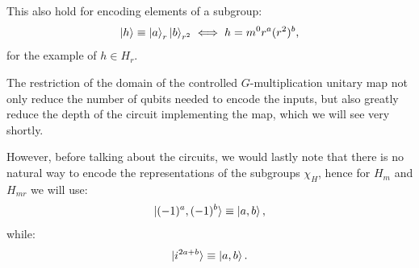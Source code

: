 \documentclass[two column]{article}
\newcommand{\caro}[1]{\textcolor{red}{[#1]}}
\begin{document}
This also hold for encoding elements of a subgroup:
\begin{equation}
    \ket{h} \equiv \ket{a}_r\ket{b}_{r^2} \iff h = m^0r^a(r^2)^b,
\end{equation}
for the example of $h \in H_r$.


The restriction of the domain of the controlled $G$-multiplication unitary map not only reduce the number of qubits needed to encode the inputs, but also greatly reduce the depth of the circuit implementing the map, which we will see very shortly.

However, before talking about the circuits, we would lastly note that there is no natural way to encode the representations of the subgroups $\chi_H$, hence for $H_m$ and $H_{mr}$ we will use:
\begin{equation}
    \ket{(-1)^a,(-1)^b} \equiv \ket{a,b},
\end{equation}
while:
\begin{equation}
    \ket{i^{2a+b}} \equiv \ket{a, b}.
\end{equation}

\end{document}
